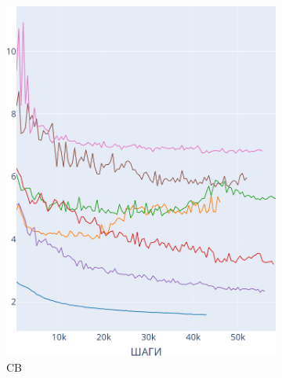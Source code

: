 \documentclass{spbau-diploma}
\begin{document}
\begin{figure}[h]
	\centering
	\begin{subfigure}{.3\textwidth}
		\centering
		\includegraphics[scale=0.2]{BooksCorpus_CB}
		\caption{CB}
		\label{fig:BooksCorpus_graphs_CB}
	\end{subfigure}
	\begin{subfigure}{.3\textwidth}
		\centering

\end{subfigure}
\end{figure}
\end{document}

